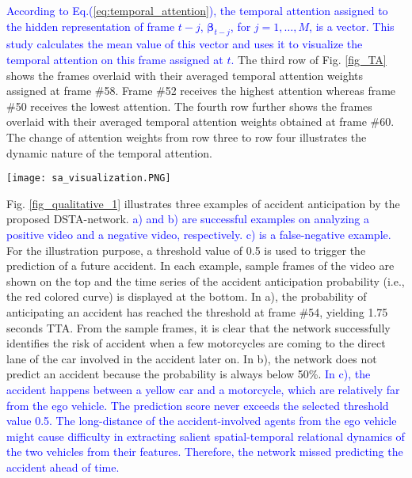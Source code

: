 \documentclass[journal]{IEEEtran}
\begin{document}
\textcolor{blue}{
According to Eq.(\ref{eq:temporal_attention}), the temporal attention assigned to the hidden representation of frame $t-j$, $\pmb{\beta}_{t-j}$, for $j=1,\dots,M$,  is a vector. This study calculates the mean value of this vector and uses it to visualize the temporal attention on this frame assigned at $t$.} The third row of Fig. \ref{fig_TA} shows the frames overlaid with their averaged temporal attention weights assigned at frame \#58. Frame \#52 receives the highest attention whereas frame \#50 receives the lowest attention. The fourth row further shows the frames overlaid with their averaged temporal attention weights obtained at frame \#60. The change of attention weights from row three to row four illustrates the dynamic nature of the temporal attention.





\begin{figure*}[htb]
\centering
\texttt{[image: sa\_visualization.PNG]}
\caption{Illustrating the dynamics of the spatial and temporal attentions of the DSTA-network}
\label{fig_TA}
\end{figure*}


Fig. \ref{fig_qualitative_1} illustrates three examples of accident anticipation by the proposed DSTA-network. \textcolor{blue}{a) and b) are successful examples on analyzing a positive video and a negative video, respectively. c) is a false-negative example.} For the illustration purpose, a threshold value of 0.5 is used to trigger the prediction of a future accident. In each example, sample frames of the video are shown on the top and the time series of the accident anticipation probability (i.e., the red colored curve) is displayed at the bottom. In a), the probability of anticipating an accident has reached the threshold at frame \#54, yielding 1.75 seconds TTA. From the sample frames, it is clear that the network successfully identifies the risk of accident when a few motorcycles are coming to the direct lane of the car involved in the accident later on. In b), the network does not predict an accident because the probability is always below 50\%. \textcolor{blue}{In c), the accident happens between a yellow car and a motorcycle, which are relatively far from the ego vehicle. The prediction score never exceeds the selected threshold value 0.5. The long-distance of the accident-involved agents from the ego vehicle might cause difficulty in extracting salient spatial-temporal relational dynamics of the two vehicles from their features. Therefore, the network missed predicting the accident ahead of time.}
\end{document}

